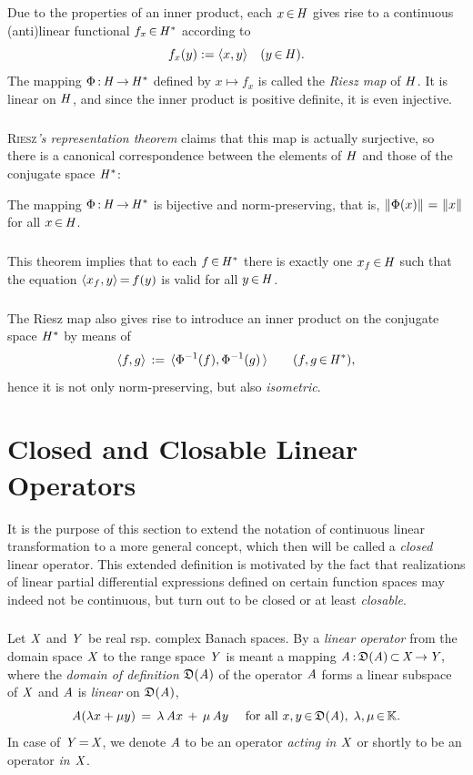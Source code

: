 \documentclass[11pt,twoside]{article}
\begin{document}
\begin{itemize}[leftmargin=5mm,itemsep=5pt]
\subparagraph{}
Due to the properties of an inner product,
each $x {\,\in\,} \mathit{H}$ gives rise to a continuous (anti)linear functional
$f_x {\,\in\,} \mathit{H}^*$ according to
\[
f_x(y) := \langle x,y \rangle \quad (y {\,\in\,} \mathit{H}).
\]
The mapping $\Phi {\,:\,} \mathit{H} {\,\to\,} \mathit{H}^*$ defined by $x \mapsto f_x$
is called the \textit{Riesz map} of $\mathit{H}$.
It is linear on $\mathit{H}$,
and since the inner product is positive definite,
it is even injective.

\subparagraph{}
\textsc{Riesz}\textit{'s representation theorem} claims
that this map is actually surjective,
so there is a canonical correspondence
between the elements of $\mathit{H}$ and those of the conjugate space $\mathit{H}^*$:

\begin{theorem}\label{RIESZ_REPRESENTATION_THEOREM}
The mapping $\Phi {\,:\,} \mathit{H} {\,\to\,} \mathit{H}^*$ is bijective and norm-preserving,
that is,
$\left\lVert \Phi(x) \right\rVert {\,=\,} \left\lVert x \right\rVert$ for all $x {\,\in\,} \mathit{H}$.
\end{theorem}

\subparagraph{}
This theorem implies that
to each $f {\,\in\,} \mathit{H}^*$ there is exactly one $x_f {\,\in\,} \mathit{H}$
such that the equation
$\langle x_f,y \rangle {\,=\,} f(y)$ is valid for all $y {\,\in\,} \mathit{H}$.

\subparagraph{}
The Riesz map also gives rise to introduce an inner product
on the conjugate space $\mathit{H}^*$ by means of
\[
\langle f,g \rangle \,:=\, \langle \Phi^{-1}(f),\Phi^{-1}(g)\, \rangle
\quad \quad (f,g {\,\in\,} \mathit{H}^*),
\]
hence it is not only norm-preserving, but also \textit{isometric}.
\end{itemize}

\section{Closed and Closable Linear Operators}
It is the purpose of this section to extend
the notation of continuous linear transformation to a more general concept,
which then will be called a \textit{closed} linear operator.
This extended definition is motivated by the fact
that realizations of linear partial differential expressions defined
on certain function spaces may indeed not be continuous,
but turn out to be closed or at least \textit{closable}.

\subsubsection*{} %
Let $\mathit{X}$ and $\mathit{Y}$ be real rsp. complex Banach spaces.
By a \textit{linear operator}
from the domain space $\mathit{X}$ to the range space $\mathit{Y}$ is meant a mapping
$
\mathit{A} {\,:\,} \mathfrak{D}(\mathit{A}) {\,\subset\,} \mathit{X} {\,\to\,} \mathit{Y},
$
where the \textit{domain of definition} $\mathfrak{D}(\mathit{A})$
of the operator $\mathit{A}$ forms a linear subspace of $\mathit{X}$
and $\mathit{A}$ is \textit{linear} on $\mathfrak{D}(\mathit{A})$,
{\ie}
\[
\mathit{A}(\lambda x + \mu y) \,=\, \lambda \, \mathit{A} x \, + \, \mu \, \mathit{A} y
\quad \mbox{ for all } x,y {\,\in\,} \mathfrak{D}(\mathit{A}), \; \lambda,\mu {\,\in\,} {\mathbb{K}}.
\]
In case of $\mathit{Y} {\,=\,} \mathit{X}$,
we denote $\mathit{A}$ to be an operator \textit{acting in $\mathit{X}$}
or shortly to be an operator \textit{in $\mathit{X}$}.
\end{document}
